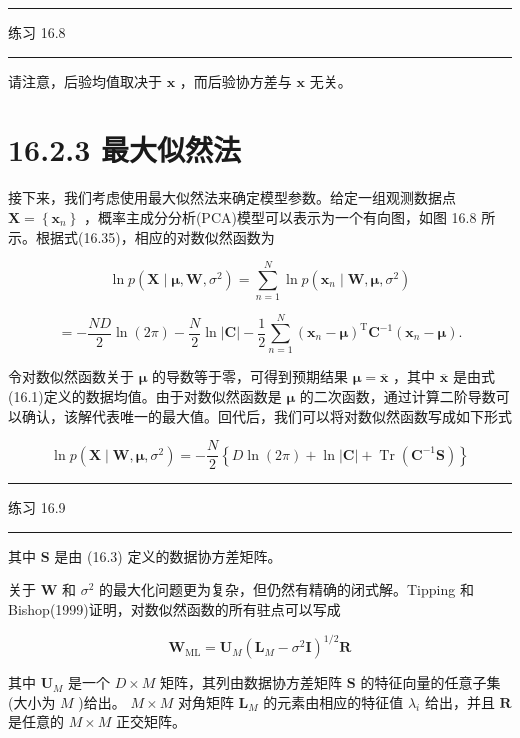 \documentclass[10pt]{article}
\newcommand{\HRule}{\begin{center}\rule{0.9\linewidth}{0.2mm}\end{center}}
\begin{document}
\HRule

练习 16.8

\HRule

请注意，后验均值取决于 \(\mathbf{x}\) ，而后验协方差与 \(\mathbf{x}\) 无关。

\section*{16.2.3 最大似然法}

接下来，我们考虑使用最大似然法来确定模型参数。给定一组观测数据点 \(\mathbf{X} = \left\{  {\mathbf{x}}_{n}\right\}\) ，概率主成分分析(PCA)模型可以表示为一个有向图，如图 16.8 所示。根据式(16.35)，相应的对数似然函数为

\[
\ln p\left( {\mathbf{X} \mid  \mathbf{\mu },\mathbf{W},{\sigma }^{2}}\right)  = \mathop{\sum }\limits_{{n = 1}}^{N}\ln p\left( {{\mathbf{x}}_{n} \mid  \mathbf{W},\mathbf{\mu },{\sigma }^{2}}\right)
\]

\[
=  - \frac{ND}{2}\ln \left( {2\pi }\right)  - \frac{N}{2}\ln \left| \mathbf{C}\right|  - \frac{1}{2}\mathop{\sum }\limits_{{n = 1}}^{N}{\left( {\mathbf{x}}_{n} - \mathbf{\mu }\right) }^{\mathrm{T}}{\mathbf{C}}^{-1}\left( {{\mathbf{x}}_{n} - \mathbf{\mu }}\right) . \tag{16.44}
\]

令对数似然函数关于 \(\mathbf{\mu }\) 的导数等于零，可得到预期结果 \(\mathbf{\mu } = \overline{\mathbf{x}}\) ，其中 \(\overline{\mathbf{x}}\) 是由式(16.1)定义的数据均值。由于对数似然函数是 \(\mathbf{\mu }\) 的二次函数，通过计算二阶导数可以确认，该解代表唯一的最大值。回代后，我们可以将对数似然函数写成如下形式

\[
\ln p\left( {\mathbf{X} \mid  \mathbf{W},\mathbf{\mu },{\sigma }^{2}}\right)  =  - \frac{N}{2}\left\{  {D\ln \left( {2\pi }\right)  + \ln \left| \mathbf{C}\right|  + \operatorname{Tr}\left( {{\mathbf{C}}^{-1}\mathbf{S}}\right) }\right\}   \tag{16.45}
\]

\HRule

练习 16.9

\HRule

其中 \(\mathbf{S}\) 是由 (16.3) 定义的数据协方差矩阵。

关于 \(\mathbf{W}\) 和 \({\sigma }^{2}\) 的最大化问题更为复杂，但仍然有精确的闭式解。Tipping 和 Bishop(1999)证明，对数似然函数的所有驻点可以写成

\[
{\mathbf{W}}_{\mathrm{{ML}}} = {\mathbf{U}}_{M}{\left( {\mathbf{L}}_{M} - {\sigma }^{2}\mathbf{I}\right) }^{1/2}\mathbf{R} \tag{16.46}
\]

其中 \({\mathbf{U}}_{M}\) 是一个 \(D \times  M\) 矩阵，其列由数据协方差矩阵 \(\mathbf{S}\) 的特征向量的任意子集(大小为 \(M\) )给出。 \(M \times  M\) 对角矩阵 \({\mathbf{L}}_{M}\) 的元素由相应的特征值 \({\lambda }_{i}\) 给出，并且 \(\mathbf{R}\) 是任意的 \(M \times  M\) 正交矩阵。
\end{document}
